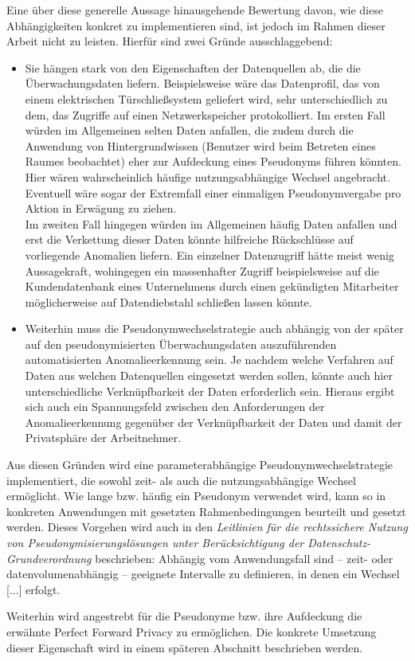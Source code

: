 Eine über diese generelle Aussage hinausgehende Bewertung davon, wie diese Abhängigkeiten konkret zu implementieren sind, ist jedoch im Rahmen dieser Arbeit nicht zu leisten. Hierfür sind zwei Gründe ausschlaggebend:
\begin{itemize}
  \item Sie hängen stark von den Eigenschaften der Datenquellen ab, die die Überwachungsdaten liefern. Beispielsweise wäre das Datenprofil, das von einem elektrischen Türschließsystem geliefert wird, sehr unterschiedlich zu dem, das Zugriffe auf einen Netzwerkspeicher protokolliert. Im ersten Fall würden im Allgemeinen selten Daten anfallen, die zudem durch die Anwendung von Hintergrundwissen (Benutzer wird beim Betreten eines Raumes beobachtet) eher zur Aufdeckung eines Pseudonyms führen könnten. Hier wären wahrscheinlich häufige nutzungsabhängige Wechsel angebracht. Eventuell wäre sogar der Extremfall einer einmaligen Pseudonymvergabe pro Aktion in Erwägung zu ziehen.\\
  Im zweiten Fall hingegen würden im Allgemeinen häufig Daten anfallen und erst die Verkettung dieser Daten könnte hilfreiche Rückschlüsse auf vorliegende Anomalien liefern. Ein einzelner Datenzugriff hätte meist wenig Aussagekraft, wohingegen ein massenhafter Zugriff beispielsweise auf die Kundendatenbank eines Unternehmens durch einen gekündigten Mitarbeiter möglicherweise auf Datendiebstahl schließen lassen könnte.
  
  \item Weiterhin muss die Pseudonymwechselstrategie auch abhängig von der später auf den pseudonymisierten Überwachungsdaten auszuführenden automatisierten Anomalieerkennung sein. Je nachdem welche Verfahren auf Daten aus welchen Datenquellen eingesetzt werden sollen, könnte auch hier unterschiedliche Verknüpfbarkeit der Daten erforderlich sein. Hieraus ergibt sich auch ein Spannungsfeld zwischen den Anforderungen der Anomalieerkennung gegenüber der Verknüpfbarkeit der Daten und damit der Privatsphäre der Arbeitnehmer.
\end{itemize}

Aus diesen Gründen wird eine parameterabhängige Pseudonymwechselstrategie implementiert, die sowohl zeit- als auch die nutzungsabhängige Wechsel ermöglicht. Wie lange bzw. häufig ein Pseudonym verwendet wird, kann so in konkreten Anwendungen mit gesetzten Rahmenbedingungen beurteilt und gesetzt werden.
Dieses Vorgehen wird auch in den \textit{Leitlinien für die rechtssichere Nutzung von Pseudonymisierungslösungen unter Berücksichtigung der Datenschutz-Grundverordnung} beschrieben: \glqq Abhängig vom Anwendungsfall sind – zeit- oder datenvolumenabhängig – geeignete Intervalle zu definieren, in denen ein Wechsel [...] erfolgt.\grqq{}\cite{schwartmann2017}

Weiterhin wird angestrebt für die Pseudonyme bzw. ihre Aufdeckung die erwähnte Perfect Forward Privacy zu ermöglichen. Die konkrete Umsetzung dieser Eigenschaft wird in einem späteren Abschnitt beschrieben werden.


